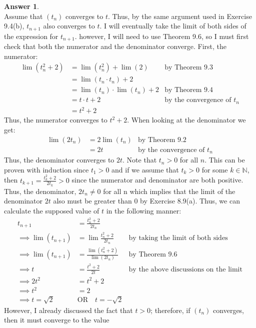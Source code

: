 \documentclass[10pt,a4paper]{article}
\theoremstyle{definition}
\newtheorem*{answer*}{Answer}
\begin{document}
\begin{answer*}{$ $}
\\Assume that $(t_n)$ converges to $t$. Thus, by the same argument used in Exercise 9.4(b), $t_{n + 1}$ also converges to $t$. I will eventually take the limit of both sides of the expression for $t_{n + 1}$. however, I will need to use Theorem 9.6, so I must first check that both the numerator and the denominator converge. First, the numerator:
\begin{align*}
\lim(t_n^2 + 2) &= \lim(t_n^2) + \lim(2) &\text{by Theorem 9.3}\\
&= \lim(t_n \cdot t_n) + 2\\
&= \lim(t_n) \cdot \lim(t_n) + 2 &\text{by Theorem 9.4}\\
&= t \cdot t + 2 &\text{by the convergence of }t_n\\
&= t^2 + 2
\end{align*}
Thus, the numerator converges to $t^2 + 2$. When looking at the denominator we get:
\begin{align*}
\lim(2t_n) &= 2\lim(t_n) &\text{by Theorem 9.2}\\
&= 2t &\text{by the convergence of }t_n
\end{align*}
Thus, the denominator converges to $2t$. Note that $t_n > 0$ for all $n$. This can be proven with induction since $t_1 > 0$ and if we assume that $t_k > 0$ for some $k \in \mathbb{N}$, then $\displaystyle t_{k +1} = \frac{t_k^2 + 2}{2t_k} > 0$ since the numerator and denominator are both positive. Thus, the denominator, $2t_n \neq 0$ for all n which implies that the limit of the denominator $2t$ also must be greater than 0 by Exercise 8.9(a). Thus, we can calculate the supposed value of $t$ in the following manner: 
\begin{align*}
t_{n + 1} &= \frac{t_n^2 + 2}{2t_n}\\
\implies \lim(t_{n + 1}) &= \lim \frac{t_n^2 + 2}{2t_n} &\text{by taking the limit of both sides}\\
\implies \lim(t_{n + 1}) &= \frac{\lim(t_n^2 + 2)}{\lim(2t_n)} &\text{by Theorem 9.6}\\
\implies t &= \frac{t^2 + 2}{2t} &\text{by the above discussions on the limit}\\
\implies 2t^2 &= t^2 + 2\\
\implies t^2 &= 2\\
\implies t = \sqrt{2} \quad &\text{OR} \quad t = -\sqrt{2}
\end{align*}
However, I already discussed the fact that $t > 0$; therefore, if $(t_n)$ converges, then it must converge to the value 
\end{answer*}
\end{document}
